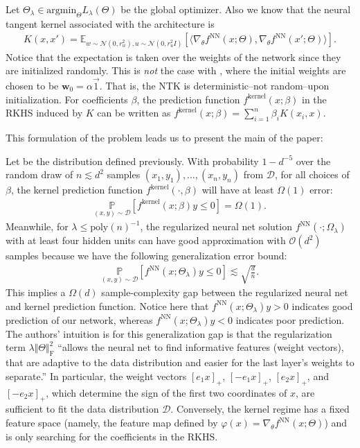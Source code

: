 \documentclass{article}
\newenvironment{manualtheorem}[1]{%
  \renewcommand\themanualtheoreminner{#1}%
  \manualtheoreminner
}{\endmanualtheoreminner}
\begin{document}
Let $\Theta_{\lambda} \in \text{argmin}_{\Theta} L_{\lambda}(\Theta)$ be the global optimizer. Also we know that the neural tangent kernel associated with the architecture is
\begin{align*}
   K(x, x') = \mathbb{E}_{w \sim \mathcal{N}(0, r_w^2), u \sim \mathcal{N}(0, r_u^2I)}[\langle \nabla_{\theta}f^{\text{NN}}(x; \Theta), \nabla_{\theta}f^{\text{NN}}(x'; \Theta)  \rangle].
\end{align*}
Notice that the expectation is taken over the weights of the network since they are initialized randomly. This is \textit{not} the case with \cite{woodworth2020kernel}, where the initial weights are chosen to be $\boldsymbol{w}_0 = \alpha \vec{1}$. That is, the NTK is deterministic--not random--upon initialization. For coefficients $\beta$, the prediction function $f^{\text{kernel}}(x; \beta)$ in the RKHS induced by $K$ can be written as $f^{\text{kernel}}(x; \beta) = \sum_{i=1}^n \beta_i K(x_i, x)$. 

This formulation of the problem leads us to present the main of the paper:
\begin{manualtheorem}{2.1}
Let  be the distribution defined previously. With probability $1 - d^{-5}$ over the random draw of $n \lesssim d^2$ samples $(x_1, y_1), \ldots, (x_n, y_n)$ from $\mathcal{D}$, for all choices of $\beta$, the kernel prediction function $f^{\text{kernel}}(\cdot, \beta)$ will have at least $\Omega(1)$ error:
\begin{align*}
    \underset{(x, y) \sim \mathcal{D}}{\mathbb{P}}[f^{\text{kernel}}(x; \beta)y \leq 0] = \Omega(1).
\end{align*}
Meanwhile, for $\lambda \leq \text{poly}(n)^{-1}$, the regularized neural net solution $f^{\text{NN}}(\cdot; \Omega_{\lambda})$ with at least four hidden units can have good approximation with $\mathcal{O}(d^2)$ samples because we have the following generalization error bound:
\begin{align*}
    \underset{(x,y) \sim \mathcal{D}}{\mathbb{P}}[f^{\text{NN}}(x;\Theta_{\lambda})y \leq 0] \lesssim \sqrt{\frac{d}{n}}.
\end{align*}
This implies a $\Omega(d)$ sample-complexity gap between the regularized neural net and kernel prediction function.
\end{manualtheorem}
Notice here that $f^{\text{NN}}(x;\Theta_{\lambda})y > 0$ indicates good prediction of our network, whereas $f^{\text{NN}}(x;\Theta_{\lambda})y < 0$ indicates poor prediction. The authors' intuition is for this generalization gap is that the regularization term $\lambda \Vert \Theta \Vert_{\text{F}}^2$ \enquote{allows the neural net to find informative features
(weight vectors), that are adaptive to the data distribution and easier for the last layer’s weights to separate.} In particular, the weight vectors $[ e_1x ]_+$, $[-e_1x ]_+$, $[e_2x ]_+$, and $[-e_2x ]_+$, which determine the sign of the first two coordinates of $x$, are sufficient to fit the data distribution $\mathcal{D}$. Conversely, the kernel regime has a fixed feature space (namely, the feature map defined by $\varphi(x) = \nabla_{\theta}f^{\text{NN}}(x; \Theta)$) and is only searching for the coefficients in the RKHS.
\end{document}
